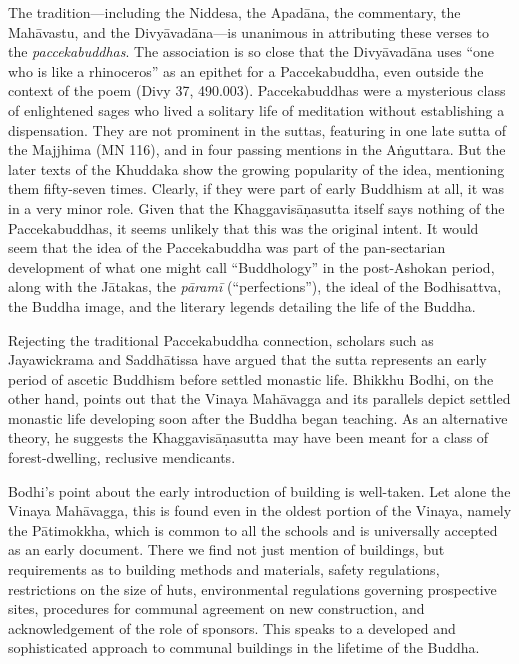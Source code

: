 \documentclass[12pt,openany]{book}%
\begin{document}
The tradition—including the Niddesa, the \textsanskrit{Apadāna}, the commentary, the \textsanskrit{Mahāvastu}, and the \textsanskrit{Divyāvadāna}—is unanimous in attributing these verses to the \textit{paccekabuddhas}. The association is so close that the \textsanskrit{Divyāvadāna} uses “one who is like a rhinoceros” as an epithet for a Paccekabuddha, even outside the context of the poem (Divy 37, 490.003). Paccekabuddhas were a mysterious class of enlightened sages who lived a solitary life of meditation without establishing a dispensation. They are not prominent in the suttas, featuring in one late sutta of the Majjhima (MN 116), and in four passing mentions in the \textsanskrit{Aṅguttara}. But the later texts of the Khuddaka show the growing popularity of the idea, mentioning them fifty-seven times. Clearly, if they were part of early Buddhism at all, it was in a very minor role. Given that the \textsanskrit{Khaggavisāṇasutta} itself says nothing of the Paccekabuddhas, it seems unlikely that this was the original intent. It would seem that the idea of the Paccekabuddha was part of the pan-sectarian development of what one might call “Buddhology” in the post-Ashokan period, along with the \textsanskrit{Jātakas}, the \textit{\textsanskrit{pāramī}} (“perfections”), the ideal of the Bodhisattva, the Buddha image, and the literary legends detailing the life of the Buddha.

Rejecting the traditional Paccekabuddha connection, scholars such as Jayawickrama and \textsanskrit{Saddhātissa} have argued that the sutta represents an early period of ascetic Buddhism before settled monastic life. Bhikkhu Bodhi, on the other hand, points out that the Vinaya \textsanskrit{Mahāvagga} and its parallels depict settled monastic life developing soon after the Buddha began teaching. As an alternative theory, he suggests the \textsanskrit{Khaggavisāṇasutta} may have been meant for a class of forest-dwelling, reclusive mendicants.

Bodhi’s point about the early introduction of building is well-taken. Let alone the Vinaya \textsanskrit{Mahāvagga}, this is found even in the oldest portion of the Vinaya, namely the \textsanskrit{Pātimokkha}, which is common to all the schools and is universally accepted as an early document. There we find not just mention of buildings, but requirements as to building methods and materials, safety regulations, restrictions on the size of huts, environmental regulations governing prospective sites, procedures for communal agreement on new construction, and acknowledgement of the role of sponsors. This speaks to a developed and sophisticated approach to communal buildings in the lifetime of the Buddha.
\end{document}
